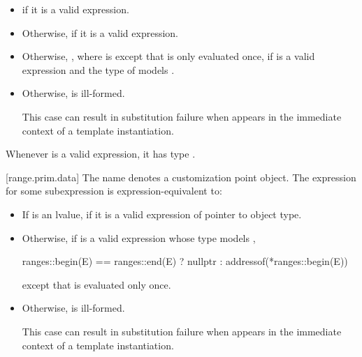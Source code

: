 \begin{itemize}
\item
   if it is a valid expression.

\item
  Otherwise,  if it is a valid expression.

\item
  Otherwise, , where  is
  except that  is only evaluated once,
  if  is a valid expression and
  the type of  models .

\item
  Otherwise,  is ill-formed.
  \begin{note}
  This case can result in substitution failure when 
  appears in the immediate context of a template instantiation.
  \end{note}
\end{itemize}

\pnum
\begin{note}
Whenever  is a valid expression,
it has type .
\end{note}

[range.prim.data]{}
\pnum
The name  denotes a customization point
object. The expression
 for some subexpression  is
expression-equivalent to:

\begin{itemize}
\item
  If  is an lvalue, 
  if it is a valid expression of pointer to object type.

\item
  Otherwise, if  is a valid expression whose type models
  ,
  \begin{codeblock}
  ranges::begin(E) == ranges::end(E) ? nullptr : addressof(*ranges::begin(E))
  \end{codeblock}

  except that  is evaluated only once.

\item
  Otherwise,  is ill-formed.
  \begin{note}
  This case can result in substitution failure when 
  appears in the immediate context of a template instantiation.
  \end{note}
\end{itemize}

